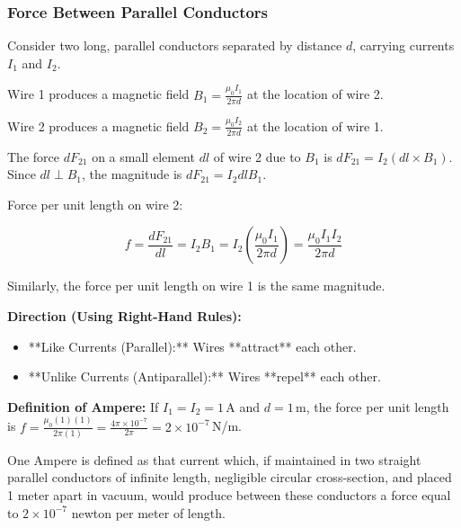 \transfade[duration=0.5]

\begin{frame}[t]
    \frametitle{\textcolor{deepnavy}{\textbf{Force Between Parallel Conductors}}}
    \renewcommand{\familydefault}{\rmdefault}
    \small

      \item<+-> Consider two long, parallel conductors separated by distance $d$, carrying currents $I_1$ and $I_2$.
      \item<+-> Wire 1 produces a magnetic field $B_1 = \frac{\mu_0 I_1}{2\pi d}$ at the location of wire 2.
      \item<+-> Wire 2 produces a magnetic field $B_2 = \frac{\mu_0 I_2}{2\pi d}$ at the location of wire 1.

    \item<+-> The force $dF_{21}$ on a small element $dl$ of wire 2 due to $B_1$ is $dF_{21} = I_2 (dl \times B_1)$.   Since $dl \perp B_1$, the magnitude is $dF_{21} = I_2 dl B_1$.
      \item<+-> Force per unit length on wire 2:
        \begin{tcolorbox}[colback=blue!5,colframe=blue!80,boxrule=0.5pt,arc=1mm,boxsep=1pt]
        \begin{equation*}
             f = \frac{dF_{21}}{dl} = I_2 B_1 = I_2 \left( \frac{\mu_0 I_1}{2\pi d} \right) = \frac{\mu_0 I_1 I_2}{2\pi d}
        \end{equation*}
          \end{tcolorbox}
      \item<+-> Similarly, the force per unit length on wire 1 is the same magnitude.

    \item<+-> \textbf{Direction (Using Right-Hand Rules):}
        \begin{itemize}[<+->]
              \item **Like Currents (Parallel):** Wires **attract** each other.
              \item **Unlike Currents (Antiparallel):** Wires **repel** each other.
        \end{itemize} %

      \item<+-> \textbf{Definition of Ampere:} If $I_1 = I_2 = 1\,$A and $d = 1\,$m, the force per unit length is $f = \frac{\mu_0 (1)(1)}{2\pi (1)} = \frac{4\pi \times 10^{-7}}{2\pi} = 2 \times 10^{-7}\,$N/m.
      \item<+-> One Ampere is defined as that current which, if maintained in two straight parallel conductors of infinite length, negligible circular cross-section, and placed 1 meter apart in vacuum, would produce between these conductors a force equal to $2 \times 10^{-7}$ newton per meter of length.
\end{frame}



